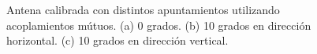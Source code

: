 \begin{figure}[H]
	\centering
 	
		\caption{Antena calibrada con distintos apuntamientos utilizando acoplamientos mútuos. (a) 0 grados. (b) 10 grados en 
		dirección horizontal. (c) 10 grados en dirección vertical.}
	\label{fig:nonErrorMutual}
\end{figure}


